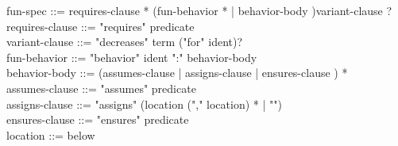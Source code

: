 \begin{syntax}
  fun-spec ::= requires-clause * (fun-behavior * | behavior-body )variant-clause ? \\
  requires-clause ::= "requires" predicate \\
  variant-clause ::= "decreases" term ("for" ident)? \\
  fun-behavior ::= "behavior" ident ":" behavior-body \\
  behavior-body ::= (assumes-clause | assigns-clause |
              ensures-clause ) * \\
  assumes-clause ::= "assumes" predicate \\
  assigns-clause ::= "assigns" (location ("," location) * |
  "\nothing") \\
  ensures-clause ::= "ensures" predicate \\
  location ::= below
\end{syntax}
